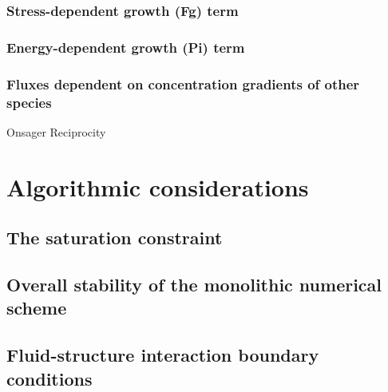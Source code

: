 \subsubsection{Stress-dependent growth (Fg) term}
\subsubsection{Energy-dependent growth (Pi) term}
\subsubsection{Fluxes dependent on concentration gradients of other
  species}
Onsager Reciprocity
\section{Algorithmic considerations}
\subsection{The saturation constraint}
\subsection{Overall stability of the monolithic numerical scheme}
\subsection{Fluid-structure interaction boundary conditions}


%

